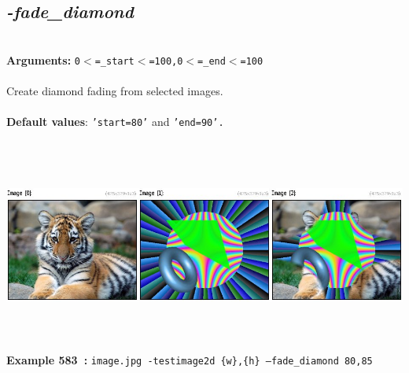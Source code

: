 \documentclass[a4paper,11pt,twoside]{book}
\begin{document}
\subsection{\emph{-fade\_diamond} }\vspace*{-0.5em}
~\\\textbf{Arguments: } 
{\small \texttt{0$<$=\_start$<$=100,0$<$=\_end$<$=100}}\\~\\
Create diamond fading from selected images.
~\\~\\\textbf{Default values}: {\small \texttt{'start=80'} and \texttt{'end=90'.}}
\begin{center}\includegraphics[keepaspectratio=true,height=7cm,width=\textwidth]{img/gmic_def583.jpg}\\
{\footnotesize \textbf{Example 583~:} \texttt{image.jpg -testimage2d \{w\},\{h\} --fade\_diamond 80,85}}
\end{center}
\end{document}
